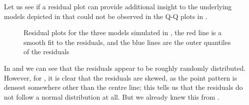 \begin{example}
	Let us see if a residual plot can provide additional insight to the underlying models depicted in  that could not be observed in the Q-Q plots in .
	\begin{figure}[H]
		\centering
		\caption[Residual plots for the three models simulated in ]{Residual plots for the three models simulated in , the red line is a smooth fit to the residuals, and the blue lines are the outer quantiles of the residuals}
		\label{fig:resid-example}
	\end{figure}

	In  and  we can see that the residuals appear to be roughly randomly distributed. However, for , it is clear that the residuals are skewed, as the point pattern is densest somewhere other than the centre line; this tells us that the residuals do not follow a normal distribution at all. But we already knew this from .


\end{example}
